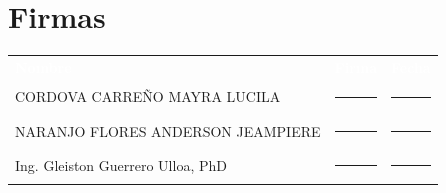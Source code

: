 \documentclass[10pt,a4paper]{article}
\newcommand{\Mayra}{CORDOVA CARREÑO MAYRA LUCILA}
\newcommand{\Anderson}{NARANJO FLORES ANDERSON JEAMPIERE}
\newcommand{\Docente}{Ing. Gleiston Guerrero Ulloa, PhD}
\begin{document}
\section{Firmas}

\vspace{0.35cm}
\noindent\begin{tabularx}{\textwidth}{Y C{4.4cm} C{3.1cm}}
\textcolor{white}{\textbf{Nombre}} &
\textcolor{white}{\textbf{Firma}} &
\textcolor{white}{\textbf{Fecha}}\\
\Mayra & \rule{4.0cm}{0.4pt} & \rule{2.6cm}{0.4pt}\\[5pt]
\Anderson & \rule{4.0cm}{0.4pt} & \rule{2.6cm}{0.4pt}\\[5pt]
\Docente & \rule{4.0cm}{0.4pt} & \rule{2.6cm}{0.4pt}\\
\end{tabularx}
\end{document}
